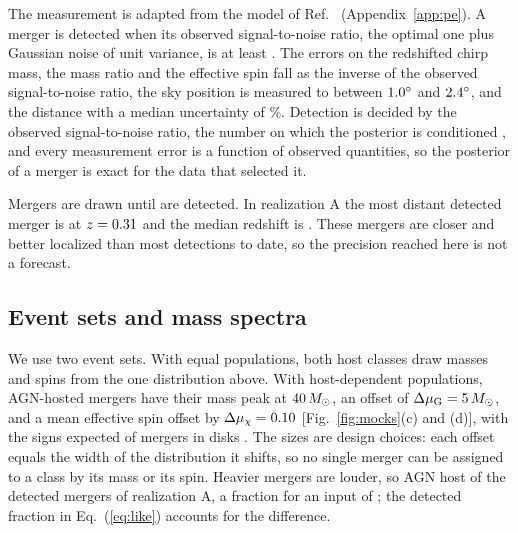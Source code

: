 \documentclass[aps,prd,reprint,twocolumn,superscriptaddress,nofootinbib,floatfix,nolongbibliography]{revtex4-2}
\newcommand{\msun}{\,M_\odot}
\newcommand{\dmuG}{\Delta\mu_{\rm G}}
\newcommand{\dmuchi}{\Delta\mu_\chi}
\begin{document}
The measurement is adapted from the model of Ref.~\cite{Farah:2023vsc}
(Appendix~\ref{app:pe}). A merger is detected when its observed
signal-to-noise ratio, the optimal one plus Gaussian noise of unit variance,
is at least \MockSNRthr. The errors on the redshifted chirp mass, the mass
ratio and the effective spin fall as the inverse of the observed
signal-to-noise ratio, the sky position is measured to between
$1.0^\circ$ and $2.4^\circ$, and the distance with a median
uncertainty of \MockSigLnDL\%. Detection is decided by the observed
signal-to-noise ratio, the number on which the posterior is conditioned
\cite{Essick:2023upv}, and every measurement error is a function of observed
quantities, so the posterior of a merger is exact for the data that selected
it.

Mergers are drawn until \MockNev{} are detected. In realization A the most
distant detected merger is at $z=0.31$ and the median redshift is
\MockzMedian. These mergers are closer and better localized than
most detections to date, so the precision reached here is not a forecast.

\subsection{Event sets and mass spectra}
\label{sec:sets}

We use two event sets. With equal populations, both host classes draw masses
and spins from the one distribution above. With host-dependent populations,
AGN-hosted mergers have their mass peak at $\MockMuGAGN\msun$, an offset of
$\dmuG=\MockDmuG\msun$, and a mean effective spin offset by
$\dmuchi=\MockDmuChi$ [Fig.~\ref{fig:mocks}(c) and (d)], with the signs
expected of mergers in disks
\cite{Yang:2019okq,Yang:2019cbr,McKernan:2021nwk}. The sizes are design
choices: each offset equals the width of the distribution it shifts, so no
single merger can be assigned to a class by its mass or its spin. Heavier
mergers are louder, so AGN host \MockHDNagn{} of the \MockNev{} detected
mergers of realization A, a fraction \MockHDfDet{} for an input of
\MockfAGN; the detected fraction in Eq.~(\ref{eq:like}) accounts for the
difference.
\end{document}
